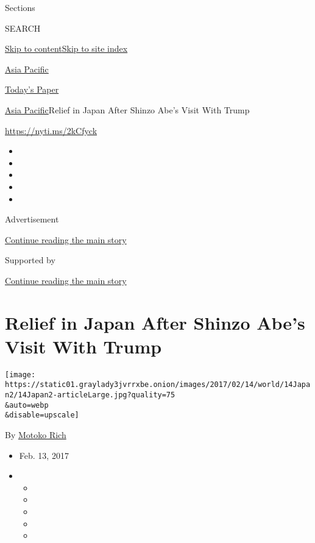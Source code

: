Sections

SEARCH

\protect\hyperlink{site-content}{Skip to
content}\protect\hyperlink{site-index}{Skip to site index}

\href{https://www.nytimes3xbfgragh.onion/section/world/asia}{Asia
Pacific}

\href{https://myaccount.nytimes3xbfgragh.onion/auth/login?response_type=cookie\&client_id=vi}{}

\href{https://www.nytimes3xbfgragh.onion/section/todayspaper}{Today's
Paper}

\href{/section/world/asia}{Asia Pacific}\textbar{}Relief in Japan After
Shinzo Abe's Visit With Trump

\url{https://nyti.ms/2kCfyck}

\begin{itemize}
\item
\item
\item
\item
\item
\end{itemize}

Advertisement

\protect\hyperlink{after-top}{Continue reading the main story}

Supported by

\protect\hyperlink{after-sponsor}{Continue reading the main story}

\hypertarget{relief-in-japan-after-shinzo-abes-visit-with-trump}{%
\section{Relief in Japan After Shinzo Abe's Visit With
Trump}\label{relief-in-japan-after-shinzo-abes-visit-with-trump}}

\texttt{[image: https://static01.graylady3jvrrxbe.onion/images/2017/02/14/world/14Japan2/14Japan2-articleLarge.jpg?quality=75\\\&auto=webp\\\&disable=upscale]}

By \href{http://www.nytimes3xbfgragh.onion/by/motoko-rich}{Motoko Rich}

\begin{itemize}
\item
  Feb. 13, 2017
\item
  \begin{itemize}
  \item
  \item
  \item
  \item
  \item
  \end{itemize}
\end{itemize}


